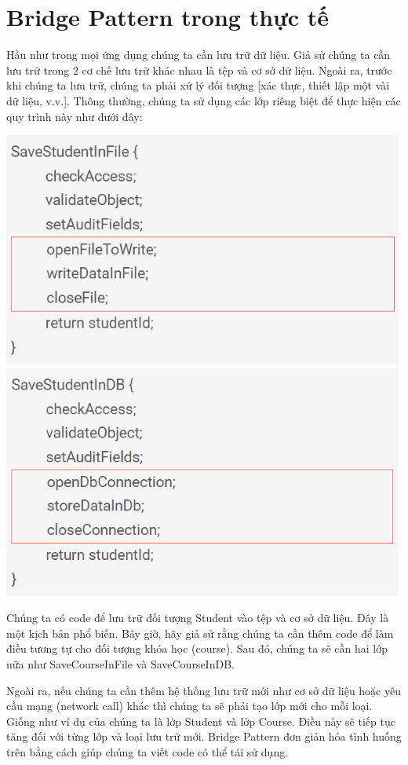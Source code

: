 \section{Bridge Pattern trong thực tế}
Hầu như trong mọi ứng dụng chúng ta cần lưu trữ dữ liệu. Giả sử chúng ta cần lưu trữ trong 2 cơ chế lưu trữ khác nhau là tệp và cơ sở dữ liệu. Ngoài ra, trước khi chúng ta lưu trữ, chúng ta phải xử lý đối tượng [xác thực, thiết lập một vài dữ liệu, v.v.]. Thông thường, chúng ta sử dụng các lớp riêng biệt để thực hiện các quy trình này như dưới đây:
\begin{multicols}{2}
	\includegraphics[width=1\columnwidth]{GALLEYS/images/chapter8/app1}
	\includegraphics[width=1\columnwidth]{GALLEYS/images/chapter8/app2}
\end{multicols}
Chúng ta có code để lưu trữ đối tượng Student vào tệp và cơ sở dữ liệu. Đây là một kịch bản phổ biến. Bây giờ, hãy giả sử rằng chúng ta cần thêm code để làm điều tương tự cho đối tượng khóa học (course). Sau đó, chúng ta sẽ cần hai lớp nữa như SaveCourseInFile và SaveCourseInDB.

Ngoài ra, nếu chúng ta cần thêm hệ thống lưu trữ mới như cơ sở dữ liệu hoặc yêu cầu mạng (network call) khác thì chúng ta sẽ phải tạo lớp mới cho mỗi loại. Giống như ví dụ của chúng ta là lớp Student và lớp Course. Điều này sẽ tiếp tục tăng đối với từng lớp và loại lưu trữ mới. Bridge Pattern đơn giản hóa tình huống trên bằng cách giúp chúng ta viết code có thể tái sử dụng.